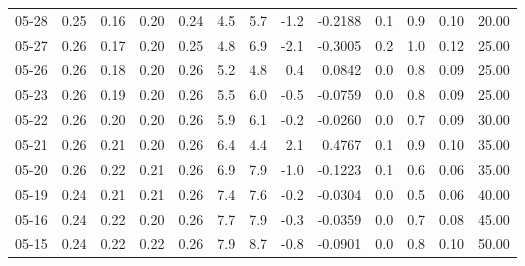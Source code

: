 \begin{threeparttable}
{\begin{tabular}{lrrrrrrrrrrrr}
  05-28 &          0.25 &          0.16 &          0.20 &        0.24 &                 4.5 &                 5.7 &       -1.2 &      -0.2188 &                 0.1 &              0.9 &            0.10 &                  20.00 \\
  05-27 &          0.26 &          0.17 &          0.20 &        0.25 &                 4.8 &                 6.9 &       -2.1 &      -0.3005 &                 0.2 &              1.0 &            0.12 &                  25.00 \\
  05-26 &          0.26 &          0.18 &          0.20 &        0.26 &                 5.2 &                 4.8 &        0.4 &       0.0842 &                 0.0 &              0.8 &            0.09 &                  25.00 \\
  05-23 &          0.26 &          0.19 &          0.20 &        0.26 &                 5.5 &                 6.0 &       -0.5 &      -0.0759 &                 0.0 &              0.8 &            0.09 &                  25.00 \\
  05-22 &          0.26 &          0.20 &          0.20 &        0.26 &                 5.9 &                 6.1 &       -0.2 &      -0.0260 &                 0.0 &              0.7 &            0.09 &                  30.00 \\
  05-21 &          0.26 &          0.21 &          0.20 &        0.26 &                 6.4 &                 4.4 &        2.1 &       0.4767 &                 0.1 &              0.9 &            0.10 &                  35.00 \\
  05-20 &          0.26 &          0.22 &          0.21 &        0.26 &                 6.9 &                 7.9 &       -1.0 &      -0.1223 &                 0.1 &              0.6 &            0.06 &                  35.00 \\
  05-19 &          0.24 &          0.21 &          0.21 &        0.26 &                 7.4 &                 7.6 &       -0.2 &      -0.0304 &                 0.0 &              0.5 &            0.06 &                  40.00 \\
  05-16 &          0.24 &          0.22 &          0.20 &        0.26 &                 7.7 &                 7.9 &       -0.3 &      -0.0359 &                 0.0 &              0.7 &            0.08 &                  45.00 \\
  05-15 &          0.24 &          0.22 &          0.22 &        0.26 &                 7.9 &                 8.7 &       -0.8 &      -0.0901 &                 0.0 &              0.8 &            0.10 &                  50.00 \\

\end{tabular}}
\end{threeparttable}
